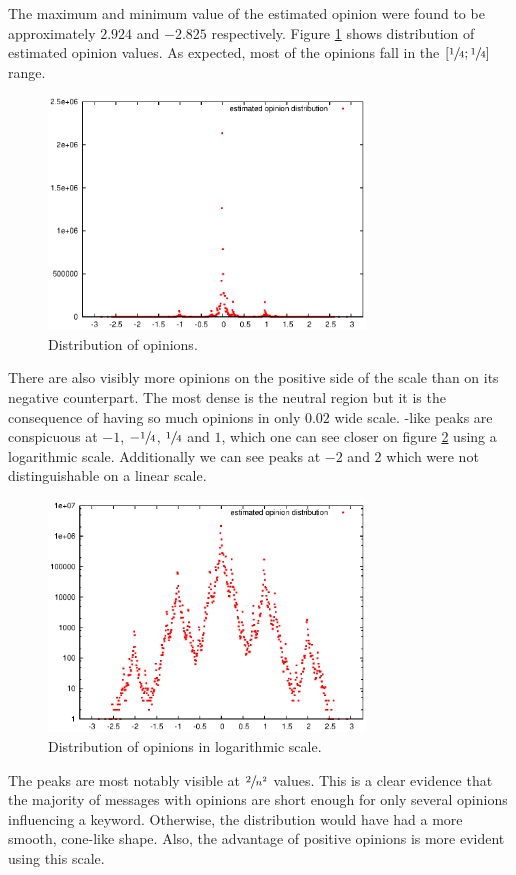       The maximum and minimum value of the estimated opinion were found to be approximately $2.924$ and $-2.825$ respectively. Figure \ref{fig:opinion_distribution_reg} shows distribution of estimated opinion values. As expected, most of the opinions fall in the $[\sfrac{1}{4};\sfrac{1}{4}]$ range.
      \begin{figure}[H]
        \centering
        \includegraphics[width=0.75\textwidth]{chapters/03_implementation/opidist}
        \caption{Distribution of opinions.}
        \label{fig:opinion_distribution_reg}
      \end{figure}
      There are also visibly more opinions on the positive side of the scale than on its negative counterpart. The most dense is the neutral region but it is the consequence of having so much opinions in only $0.02$ wide scale. -like peaks are conspicuous at $-1$, $-\sfrac{1}{4}$, $\sfrac{1}{4}$ and $1$, which one can see closer on figure \ref{fig:opinion_distribution_log} using a logarithmic scale. Additionally we can see peaks at $-2$ and $2$ which were not distinguishable on a linear scale.
      \begin{figure}[H]
        \centering
        \includegraphics[width=0.75\textwidth]{chapters/03_implementation/opidist_log}
        \caption{Distribution of opinions in logarithmic scale.}
        \label{fig:opinion_distribution_log}
      \end{figure}
      The peaks are most notably visible at $\sfrac{2}{n^2}$ values. This is a clear evidence that the majority of messages with opinions are short enough for only several opinions influencing a keyword. Otherwise, the distribution would have had a more smooth, cone-like shape. Also, the advantage of positive opinions is more evident using this scale.

